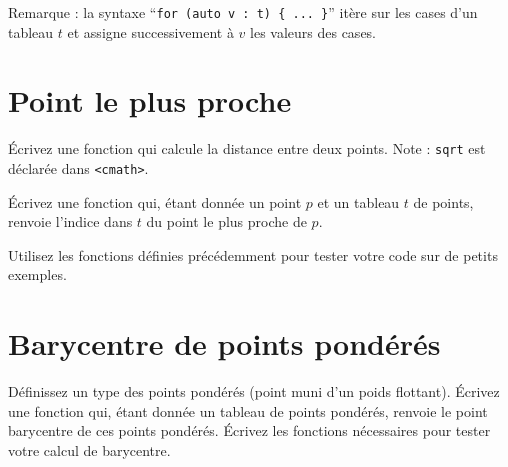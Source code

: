 \documentclass[a4paper]{article}
\begin{document}
Remarque : la syntaxe ``\lstinline|for (auto v : t) { ... }|'' itère sur les
cases d'un tableau $t$ et assigne successivement à $v$ les valeurs des
cases.

\section{Point le plus proche}

Écrivez une fonction qui calcule la distance entre deux points. Note :
\lstinline|sqrt| est déclarée dans \lstinline|<cmath>|.

Écrivez une fonction qui, étant donnée un point $p$ et un tableau $t$ de
points, renvoie l'indice dans $t$ du point le plus proche de
$p$.

Utilisez les fonctions définies précédemment pour tester votre code sur
de petits exemples.

\section{Barycentre de points pondérés}

Définissez un type des points pondérés (point muni d'un poids
flottant). Écrivez une fonction qui, étant donnée un tableau de points
pondérés, renvoie le point barycentre de ces points pondérés. Écrivez
les fonctions nécessaires pour tester votre calcul de barycentre.
\end{document}
